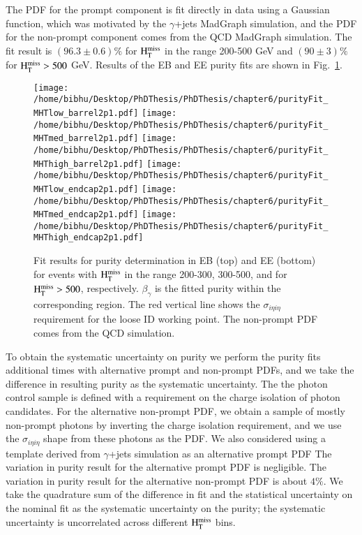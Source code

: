  The PDF for the prompt component is fit directly in data
using a Gaussian function, which was motivated by the $\gamma$+jets 
{\sc MadGraph} simulation, and the PDF for the non-prompt component comes from the QCD 
{\sc MadGraph} simulation.    The fit result is $(96.3 \pm 0.6)\%$ for $\rm H_{T}^{miss}$ in the range 200-500 GeV 
and $(90 \pm 3)\%$ for $\rm H_{T}^{miss} > 500$ GeV. Results of the EB and EE purity fits are shown in Fig.~\ref{fig:purity}. 

\begin{figure}[h]
\begin{center}
\texttt{[image: /home/bibhu/Desktop/PhDThesis/PhDThesis/chapter6/purityFit\_MHTlow\_barrel2p1.pdf]} 
\texttt{[image: /home/bibhu/Desktop/PhDThesis/PhDThesis/chapter6/purityFit\_MHTmed\_barrel2p1.pdf]} 
\texttt{[image: /home/bibhu/Desktop/PhDThesis/PhDThesis/chapter6/purityFit\_MHThigh\_barrel2p1.pdf]} 
\texttt{[image: /home/bibhu/Desktop/PhDThesis/PhDThesis/chapter6/purityFit\_MHTlow\_endcap2p1.pdf]} 
\texttt{[image: /home/bibhu/Desktop/PhDThesis/PhDThesis/chapter6/purityFit\_MHTmed\_endcap2p1.pdf]} 
\texttt{[image: /home/bibhu/Desktop/PhDThesis/PhDThesis/chapter6/purityFit\_MHThigh\_endcap2p1.pdf]} 
\caption{Fit results for purity determination in EB (top) and EE (bottom) for events with $\rm H_{T}^{miss}$ in the range 200-300, 300-500, and for $\rm H_{T}^{miss} > 500$, 
respectively.  $\beta_\gamma$ is the fitted purity within the corresponding region.  The red vertical line shows the $\sigma_{i\eta i\eta}$  requirement for the loose ID working point.  The non-prompt PDF comes from the QCD simulation.}
\label{fig:purity}
\end{center}
\end{figure}






To obtain the systematic uncertainty on purity we perform the purity fits additional times with alternative prompt and 
non-prompt PDFs, and we take the difference in resulting purity as the systematic uncertainty.  The %
the photon control sample is defined with a requirement on the charge isolation of photon candidates.
For the alternative non-prompt PDF, we obtain a sample of mostly non-prompt photons by inverting 
the charge isolation requirement, and we use the $\sigma_{i\eta i\eta}$ shape from these photons as the PDF.
We also considered using a template derived from $\gamma$+jets simulation as an alternative prompt PDF
The variation in purity result for the alternative prompt PDF is negligible.  
The variation in purity result for the alternative non-prompt PDF is about $4\%$.
We take the quadrature sum of the difference in fit and the statistical uncertainty on the nominal fit as the systematic 
uncertainty on the purity; the systematic uncertainty is uncorrelated across different $\rm H_{T}^{miss}$ bins.



